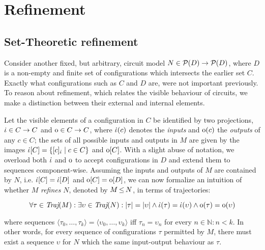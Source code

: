 \section{Refinement}

\subsection{Set-Theoretic refinement}

Consider another fixed, but arbitrary, circuit model $N \in \mathcal{P}(D) \rightarrow \mathcal{P}(D)$, where $D$ is a non-empty and finite set of configurations which intersects the earlier set $C$. Exactly what configurations such as $C$ and $D$ are, were not important previously. To reason about refinement, which relates the visible behaviour of circuits, we make a distinction between their external and internal elements.


Let the visible elements of a configuration in $C$ be identified by two projections, $\dot{\iota} \in C \rightarrow C$ and $\mathrm{o} \in C \rightarrow C$, where $\dot{\iota}(c)$ denotes the \textit{inputs} and $\mathrm{o}(c)$ the \textit{outputs} of any $c \in C$; the sets of all possible inputs and outputs in $M$ are given by the images $\dot{\iota}[C] = \{ [c]_{\dot{\iota}} \mid c \in C \}$ and $\mathrm{o}[C]$. With a slight abuse of notation, we overload both $\dot{\iota}$ and $\mathrm{o}$ to accept configurations in $D$ and extend them to sequences component-wise. Assuming the inputs and outputs of $M$ are contained by $N$, i.e. $\dot{\iota}[C] = \dot{\iota}[D]$ and $\mathrm{o}[C] = \mathrm{o}[D]$, we can now formalize an intuition of whether $M$ \textit{refines} $N$, denoted by $M \operatorname{\leq} N$, in terms of trajectories:


\begin{equation*}
\forall \tau \in \operatorname{\textit{Traj}}(M) : \exists \upsilon \in \operatorname{\textit{Traj}}(N) : | \tau | = | \upsilon | \wedge \dot{\iota}(\tau) = \dot{\iota}(\upsilon) \wedge \mathrm{o}(\tau) = \mathrm{o}(\upsilon)
\end{equation*}

\noindent where sequences $\langle \tau_{0}, \ldots, \tau_{k} \rangle = \langle \upsilon_{0}, \ldots, \upsilon_{k} \rangle$ iff $\tau_{n} = \upsilon_{n}$ for every $n \in \mathbb{N} : n < k$. In other words, for every sequence of configurations $\tau$ permitted by $M$, there must exist a sequence $\upsilon$ for $N$ which the same input-output behaviour as $\tau$.

